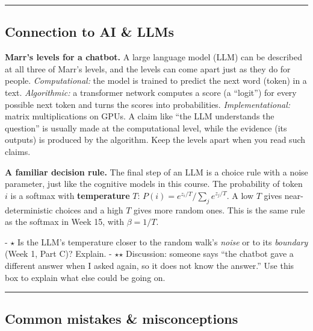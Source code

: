\begin{center}\rule{0.5\linewidth}{0.5pt}\end{center}

\subsection{Connection to AI \& LLMs}

\textbf{Marr's levels for a chatbot.} A large language model (LLM) can
be described at all three of Marr's levels, and the levels can come
apart just as they do for people. \emph{Computational:} the model is
trained to predict the next word (token) in a text. \emph{Algorithmic:}
a transformer network computes a score (a ``logit'') for every possible
next token and turns the scores into probabilities.
\emph{Implementational:} matrix multiplications on GPUs. A claim like
``the LLM understands the question'' is usually made at the
computational level, while the evidence (its outputs) is produced by the
algorithm. Keep the levels apart when you read such claims.

\textbf{A familiar decision rule.} The final step of an LLM is a choice
rule with a noise parameter, just like the cognitive models in this
course. The probability of token \(i\) is a softmax with
\textbf{temperature} \(T\): \(P(i) = e^{z_i/T}/\sum_j e^{z_j/T}\). A low
\(T\) gives near-deterministic choices and a high \(T\) gives more
random ones. This is the same rule as the softmax in Week 15, with
\(\beta = 1/T\).

- \ensuremath{\star} Is the LLM's temperature closer to the random walk's \emph{noise} or
to its \emph{boundary} (Week 1, Part C)? Explain. - \ensuremath{\star}\ensuremath{\star} Discussion:
someone says ``the chatbot gave a different answer when I asked again,
so it does not know the answer.'' Use this box to explain what else
could be going on.

\begin{center}\rule{0.5\linewidth}{0.5pt}\end{center}

\subsection{Common mistakes \& misconceptions}

